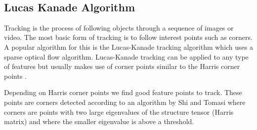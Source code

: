 \begin{figure}[h]
\begin{dBox}
\centering
  \mbox{
   }
   \caption{\label{fig:dynamic91011} }   
\end{dBox}   
\end{figure}

\subsection{Lucas Kanade Algorithm }
Tracking is the process of following objects through a sequence of images or video. The most basic form of tracking is to follow interest points such as corners. A popular algorithm for this is the Lucas-Kanade tracking algorithm \cite{dynamic3} which uses a sparse optical flow algorithm. Lucas-Kanade tracking can be applied to any type of features but usually makes use of corner points similar to the Harris corner points \cite{dynamic4} .\bigskip

Depending on Harris corner points we find good feature points to track. These points are corners detected according to an algorithm by Shi and Tomasi \cite{dynamic5}  where corners are points with two large eigenvalues of the structure tensor (Harris matrix) and where the smaller eigenvalue is above a threshold.\bigskip

